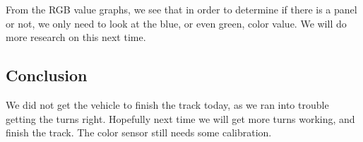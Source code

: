 From the RGB value graphs, we see that in order to determine if there is
a panel or not, we only need to look at the blue, or even green, color
value. We will do more research on this next time.

\subsection{Conclusion}

We did not get the vehicle to finish the track today, as we ran into
trouble getting the turns right. Hopefully next time we will get more
turns working, and finish the track. The color sensor still needs some
calibration.
